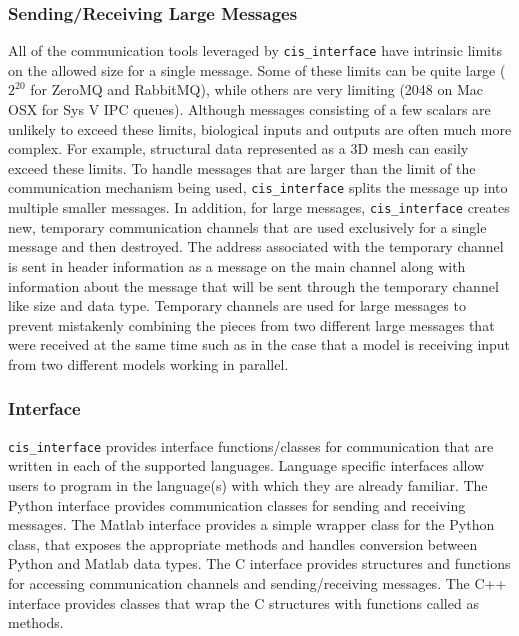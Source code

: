 \documentclass[journal]{IEEEtran}
\newcommand{\cis}{{\tt cis\_interface}{}}
\begin{document}
\subsubsection{Sending/Receiving Large Messages}\label{SSS:large}
%
All of the communication tools leveraged by {\cis} have intrinsic limits 
on the allowed size for a single message. Some of these limits can be quite large 
($2^{20}$ for ZeroMQ and RabbitMQ), while others are very limiting 
(2048 on Mac OSX for Sys V IPC queues). Although messages consisting of a few scalars are unlikely to 
exceed these limits, biological inputs and outputs are often much more complex. 
For example, structural data represented as a 3D mesh can easily exceed these 
limits. To handle messages that are larger than the limit of the communication 
mechanism being used, {\cis} splits the message up into multiple smaller 
messages. In addition, for large messages, {\cis} creates new, temporary 
communication channels that are used exclusively for a single message and 
then destroyed. The address associated with the temporary channel is sent in 
header information as a message on the main channel along with information about 
the message that will be sent through the temporary channel like size and data type. 
Temporary channels are used for large messages to prevent mistakenly combining 
the pieces from two different large messages that were received at the same time 
such as in the case that a model is receiving input from two different models 
working in parallel.

\subsubsection{Interface}\label{SSS:interface}
%
{\cis} provides interface functions/classes for communication that are 
written in each of the supported languages. Language specific interfaces 
allow users to program in the 
language(s) with which they are already familiar. The Python interface provides 
communication classes for sending and receiving messages. The Matlab 
interface provides a simple wrapper class for the Python class, that exposes 
the appropriate methods and handles conversion between Python and Matlab 
data types. The C interface provides structures and functions for accessing 
communication channels and sending/receiving messages. The C++ interface 
provides classes that wrap the C structures with functions called as methods.
\end{document}
